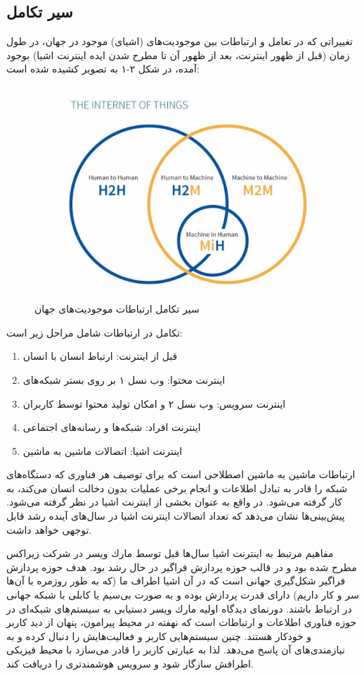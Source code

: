 \subsection{سیر تکامل}
تغییراتی که در تعامل و ارتباطات بین موجودیت‌های (اشیای) موجود در جهان، در طول زمان (قبل از ظهور اینترنت، بعد از ظهور آن تا مطرح شدن ایده اینترنت اشیا) بوجود آمده، در شكل ۲-۱ به
تصویر کشیده شده است:
\begin{figure}[!h]
	\centerline{\includegraphics[width=.7\textwidth]{iot-m2m}}
	\caption{سیر تکامل ارتباطات موجودیت‌های جهان \cite{connection}}
\end{figure}

تكامل در ارتباطات شامل مراحل زیر است:
\begin{enumerate}
	\item
	 قبل از اینترنت: ارتباط انسان با انسان
	\item
	اینترنت محتوا: وب نسل ۱ بر روی بستر شبکه‌های 
	\item 
	اینترنت سرویس: وب نسل ۲ و امکان تولید محتوا توسط کاربران
	\item 
	اینترنت افراد: شبکه‌ها و رسانه‌های اجتماعی
	\item
	اینترنت اشیا: اتصالات ماشین به ماشین
\end{enumerate}


ارتباطات ماشین به ماشین اصطلاحی است که برای توصیف هر فناوری که دستگاه‌های شبكه را قادر به تبادل اطلاعات و انجام برخی عملیات بدون دخالت انسان می‌کند، به کار گرفته می‌شود. در واقع به عنوان بخشی از اینترنت اشیا در نظر گرفته می‌شود. پیش‌بینی‌ها نشان می‌دهد که تعداد اتصالات اینترنت اشیا در سال‌های آینده رشد قابل توجهی خواهد داشت.


مفاهیم مرتبط به اینترنت اشیا سال‌ها قبل توسط مارك ویسر در شرکت زیراکس مطرح شده بود و
در قالب حوزه پردازش فراگیر در حال رشد بود. هدف حوزه پردازش فراگیر شكل‌گیری جهانی است که در آن اشیا اطراف ما (که به طور روزمره با آن‌ها سر و کار داریم) دارای قدرت پردازش بوده و به
صورت بی‌سیم یا کابلی با شبكه جهانی در ارتباط باشند. دورنمای دیدگاه اولیه مارك ویسر دستیابی به سیستم‌های شبكه‌ای در حوزه فناوری اطلاعات و ارتباطات است که نهفته در محیط پیرامون، پنهان از دید کاربر و خودکار هستند. چنین سیستم‌هایی کاربر و فعالیت‌هایش را دنبال کرده و به نیازمندی‌های آن پاسخ می‌دهد. لذا به عبارتی کاربر را قادر می‌سازد با محیط فیزیكی اطرافش سازگار شود و سرویس هوشمندتری را دریافت کند.

